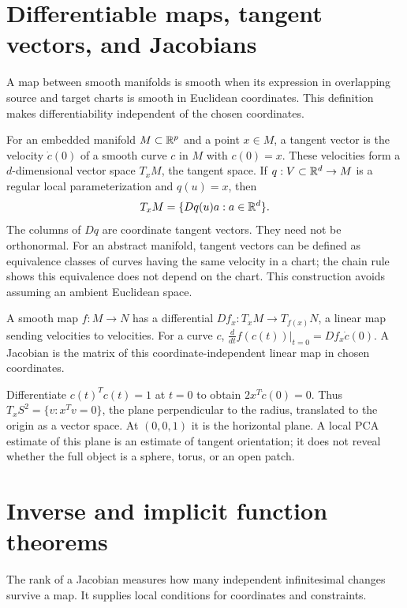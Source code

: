 \section{Differentiable maps, tangent vectors, and Jacobians}
A map between smooth manifolds is smooth when its expression in overlapping source and target charts is smooth in Euclidean coordinates. This definition makes differentiability independent of the chosen coordinates.

For an embedded manifold $M\subset\mathbb{R}^p$ and a point $x\in M$, a tangent vector is the velocity $\dot c(0)$ of a smooth curve $c$ in $M$ with $c(0)=x$. These velocities form a $d$-dimensional vector space $T_xM$, the tangent space. If $q:V\subset\mathbb{R}^d\to M$ is a regular local parameterization and $q(u)=x$, then
\begin{equation}\label{eq:tangent-param}
T_xM=\{Dq(u)a:a\in\mathbb{R}^d\}.
\end{equation}
The columns of $Dq$ are coordinate tangent vectors. They need not be orthonormal. For an abstract manifold, tangent vectors can be defined as equivalence classes of curves having the same velocity in a chart; the chain rule shows this equivalence does not depend on the chart. This construction avoids assuming an ambient Euclidean space.

A smooth map $f:M\to N$ has a differential $Df_x:T_xM\to T_{f(x)}N$, a linear map sending velocities to velocities. For a curve $c$, $\frac{d}{dt}f(c(t))|_{t=0}=Df_x\dot c(0)$. A Jacobian is the matrix of this coordinate-independent linear map in chosen coordinates.

\begin{example}
Differentiate $c(t)^Tc(t)=1$ at $t=0$ to obtain $2x^T\dot c(0)=0$. Thus $T_xS^2=\{v:x^Tv=0\}$, the plane perpendicular to the radius, translated to the origin as a vector space. At $(0,0,1)$ it is the horizontal plane. A local PCA estimate of this plane is an estimate of tangent orientation; it does not reveal whether the full object is a sphere, torus, or an open patch.
\end{example}

\section{Inverse and implicit function theorems}
The rank of a Jacobian measures how many independent infinitesimal changes survive a map. It supplies local conditions for coordinates and constraints.

